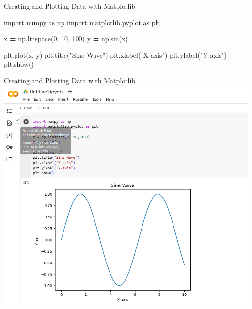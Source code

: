 \documentclass[
  ignorenonframetext,
]{beamer}
\newenvironment{Shaded}{\begin{snugshade}}{\end{snugshade}}
\newcommand{\DecValTok}[1]{\textcolor[rgb]{0.00,0.00,0.81}{#1}}
\newcommand{\ImportTok}[1]{#1}
\newcommand{\NormalTok}[1]{#1}
\newcommand{\OperatorTok}[1]{\textcolor[rgb]{0.81,0.36,0.00}{\textbf{#1}}}
\newcommand{\StringTok}[1]{\textcolor[rgb]{0.31,0.60,0.02}{#1}}
\begin{document}
\begin{frame}[fragile]{Creating and Plotting Data with Matplotlib}
\label{creating-and-plotting-data-with-matplotlib}

\begin{Shaded}
\begin{Highlighting}[]
\ImportTok{import}\NormalTok{ numpy }\ImportTok{as}\NormalTok{ np}
\ImportTok{import}\NormalTok{ matplotlib.pyplot }\ImportTok{as}\NormalTok{ plt}

\NormalTok{x }\OperatorTok{=}\NormalTok{ np.linspace(}\DecValTok{0}\NormalTok{, }\DecValTok{10}\NormalTok{, }\DecValTok{100}\NormalTok{)}
\NormalTok{y }\OperatorTok{=}\NormalTok{ np.sin(x)}

\NormalTok{plt.plot(x, y)}
\NormalTok{plt.title(}\StringTok{"Sine Wave"}\NormalTok{)}
\NormalTok{plt.xlabel(}\StringTok{"X{-}axis"}\NormalTok{)}
\NormalTok{plt.ylabel(}\StringTok{"Y{-}axis"}\NormalTok{)}
\NormalTok{plt.show()}
\end{Highlighting}
\end{Shaded}
\end{frame}

\begin{frame}{Creating and Plotting Data with Matplotlib}
\label{creating-and-plotting-data-with-matplotlib-1}
\includegraphics{../images/im223.png}
\end{frame}
\end{document}
